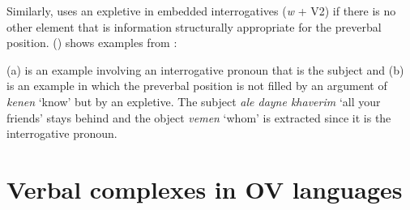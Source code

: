 \largerpage
\noindent
Similarly,  uses an expletive in embedded interrogatives (\emph{w} + V2) if 
there is no other element that is information structurally appropriate for the preverbal position.
() shows examples from \citet[--404]{Prince89a}:

\eal
{}
\zl
(a) is an example involving an interrogative pronoun that is the subject and (b) is an
example in which the preverbal position is not filled by an argument of \emph{kenen} `know' but by
an expletive. The subject \emph{ale dayne khaverim} `all your friends' stays behind and the object
\emph{vemen} `whom' is extracted since it is the interrogative pronoun.



\section{Verbal complexes in OV languages}


